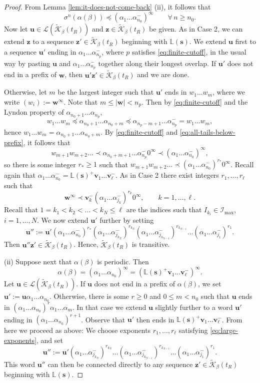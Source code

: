 \documentclass[11pt]{amsart}
\theoremstyle{definition}
\theoremstyle{remark}
\numberwithin{equation}{section}
\renewcommand{\L}{\ensuremath{\mathbb{L}}}
\newcommand{\II}{\mathcal{I}}
\newcommand{\Kt}{\widetilde{\mathcal{K}}}
\newcommand{\s}{ {\mathbf{s}}}
\newcommand{\cL}{\mathcal{L}}
\renewcommand{\u}{\mathbf{u}}
\renewcommand{\v}{\mathbf{v}}
\newcommand{\w}{\mathbf{w}}
\newcommand{\z}{\mathbf{z}}
\newcommand{\f}{\infty}
\newcommand{\al}{\alpha}
\newcommand{\lle}{\preccurlyeq}
\newcommand{\si}{\sigma}
\begin{document}
\begin{proof}
From Lemma \ref{lem:it-does-not-come-back} (ii), it follows that
\begin{equation} \label{eq:all-tails-below-prefix}
\si^n(\al(\beta))\lle (\al_1\dots\al_{n_0}^-)^\f \qquad\forall\,n\geq n_0.
\end{equation}
Now let $\u\in\cL(\Kt_\beta(t_R))$ and $\z\in\Kt_\beta(t_R)$ be given. As in Case 2, we can extend $\z$ to a sequence $\z'\in\Kt_\beta(t_R)$ beginning with $\L(\s)$. We extend $\u$ first to a sequence $\u'$ ending in $\al_1\dots\al_{n_{p}}^-$, where ${p}$ satisfies \eqref{eq:finite-cutoff}, in the usual way by pasting $\u$ and $\al_1\dots\al_{n_{p}}^-$ together along their longest overlap. If $\u'$ does not end in a prefix of $\w$, then $\u'\z'\in\Kt_\beta(t_R)$ and we are done.

Otherwise, let $m$ be the largest integer such that $\u'$ ends in $w_1\dots w_m$, where we write $(w_i):=\w^\f$. {Note that $m\leq |\w|<n_p$.} Then by \eqref{eq:finite-cutoff} and the Lyndon property of $\al_{n_0+1}\dots\al_{n_{p}}$,
\[
w_1\dots w_m\lle \al_{n_0+1}\dots\al_{n_0+m}\lle \al_{n_{p}-m+1}\dots\al_{n_{p}}^-=w_1\dots w_m,
\]
hence $w_1\dots w_m=\al_{n_0+1}\dots\al_{n_0+m}$. By \eqref{eq:finite-cutoff} and \eqref{eq:all-tails-below-prefix}, it follows that
\[
w_{m+1}w_{m+2}\dots \prec \al_{n_0+m+1}\dots\al_{n_{p}}^-0^\f \prec (\al_1\dots\al_{n_0}^-)^\f,
\]
so there is some integer $r_*\geq 1$ such that $w_{m+1}w_{m+2}\dots\prec (\al_1\dots\al_{n_0}^-)^{r_*} 0^\f$.
Recall again that $\al_1\dots\al_{n_0}^-=\L(\s)^+\v_1\dots\v_{\ell}^-$. As in Case 2 there exist integers $r_1,\dots,r_{\ell}$ such that
\begin{equation} \label{eq:large-exponents}
\w^\f\prec \v_k^-(\al_1\dots\al_{j_k}^-)^{r_k} 0^\f, \qquad k=1,\dots,\ell.
\end{equation}
{Recall that $1=k_1<k_2<\dots<k_N\leq \ell$ are the indices such that $I_{k_i}\in\II_{\max}$, $i=1,\dots,N$.}
We now extend $\u'$ further by setting
\[
\u'':=\u'(\al_1\dots\al_{n_0}^-)^{r_*}{(\al_1\dots\al_{j_{k_N}}^-)^{r_{k_N}}(\al_1\dots\al_{j_{k_{N-1}}}^-)^{r_{k_{N-1}}}\dots (\al_1\dots\al_{j_1}^-)^{r_1}}.
\]
Then $\u''\z'\in\Kt_\beta(t_R)$. Hence, $\Kt_\beta(t_R)$ is transitive.

(ii) Suppose next that $\al(\beta)$ is periodic. Then
\[
\al(\beta)=(\al_1\dots\al_{n_0})^\f=(\L(\s)^+\v_1\dots\v_{\ell}^-)^\f.
\]
Let $\u\in\cL(\Kt_\beta(t_R))$. If $\u$ does not end in a prefix of $\al(\beta)$, we set $\u':=\u\al_1\dots\al_{n_0}$. Otherwise, there is some $r\geq 0$ and $0\leq m<n_0$ such that $\u$ ends in $(\al_1\dots\al_{n_0})^r\al_1\dots\al_m$. In that case we extend $\u$ slightly further to a word $\u'$ ending in $(\al_1\dots\al_{n_0})^{r+1}$. Observe that $\u'$ then ends in $\L(\s)^+\v_1\dots\v_{\ell}^-$. From here we proceed as above: We choose exponents $r_1,\dots,r_{\ell}$ satisfying \eqref{eq:large-exponents}, and set
\[
\u'':=\u'{(\al_1\dots\al_{j_{k_N}}^-)^{r_{k_N}}\dots (\al_1\dots\al_{j_{k_{N-1}}}^-)^{r_{k_{N-1}}}\dots (\al_1\dots\al_{j_1}^-)^{r_1}}.
\]
This word $\u''$ can then be connected directly to any sequence $\z'\in\Kt_\beta(t_R)$ beginning with $\L(\s)$.
\end{proof}
\end{document}
